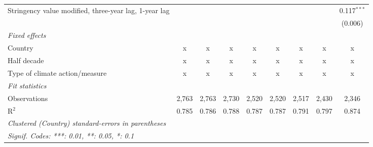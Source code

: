 \begin{table}[htbp]
\begin{tabular}{lcccccccc}
      Stringency value modified, three-year lag, 1-year lag                 &              &               &                &                &                &                &                & 0.117$^{***}$\\   
                                                                            &              &               &                &                &                &                &                & (0.006)\\   
      \emph{Fixed effects}\\
      Country                                                               & x            & x             & x              & x              & x              & x              & x              & x\\  
      Half decade                                                           & x            & x             & x              & x              & x              & x              & x              & x\\  
      Type of climate action/measure                                        & x            & x             & x              & x              & x              & x              & x              & x\\  
      \midrule \emph{Fit statistics}\\
      Observations                                                          & 2,763        & 2,763         & 2,730          & 2,520          & 2,520          & 2,517          & 2,430          & 2,346\\  
      R$^2$                                                                 & 0.785        & 0.786         & 0.788          & 0.787          & 0.787          & 0.791          & 0.797          & 0.874\\  
      \midrule
      \multicolumn{9}{l}{\emph{Clustered (Country) standard-errors in parentheses}}\\
      \multicolumn{9}{l}{\emph{Signif. Codes: ***: 0.01, **: 0.05, *: 0.1}}\\
   \end{tabular}
\end{table}


